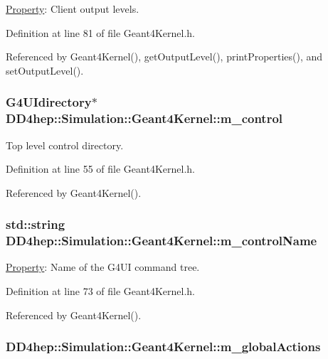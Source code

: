 \hyperlink{class_d_d4hep_1_1_property}{Property}: Client output levels. 

Definition at line 81 of file Geant4Kernel.h.

Referenced by Geant4Kernel(), getOutputLevel(), printProperties(), and setOutputLevel().\hypertarget{class_d_d4hep_1_1_simulation_1_1_geant4_kernel_a1b097ce042c194b7fc041c3457868c2c}{
\subsubsection[{m\_\-control}]{\setlength{\rightskip}{0pt plus 5cm}G4UIdirectory$\ast$ {\bf DD4hep::Simulation::Geant4Kernel::m\_\-control}}}
\label{class_d_d4hep_1_1_simulation_1_1_geant4_kernel_a1b097ce042c194b7fc041c3457868c2c}


Top level control directory. 

Definition at line 55 of file Geant4Kernel.h.

Referenced by Geant4Kernel().\hypertarget{class_d_d4hep_1_1_simulation_1_1_geant4_kernel_a1019ec87b302f798f36361dd9be8b40a}{
\subsubsection[{m\_\-controlName}]{\setlength{\rightskip}{0pt plus 5cm}std::string {\bf DD4hep::Simulation::Geant4Kernel::m\_\-controlName}}}
\label{class_d_d4hep_1_1_simulation_1_1_geant4_kernel_a1019ec87b302f798f36361dd9be8b40a}


\hyperlink{class_d_d4hep_1_1_property}{Property}: Name of the G4UI command tree. 

Definition at line 73 of file Geant4Kernel.h.

Referenced by Geant4Kernel().\hypertarget{class_d_d4hep_1_1_simulation_1_1_geant4_kernel_a23bac03e5a169b5fc9446e574ad034ac}{
\subsubsection[{m\_\-globalActions}]{ {\bf DD4hep::Simulation::Geant4Kernel::m\_\-globalActions}}}
\label{class_d_d4hep_1_1_simulation_1_1_geant4_kernel_a23bac03e5a169b5fc9446e574ad034ac}


